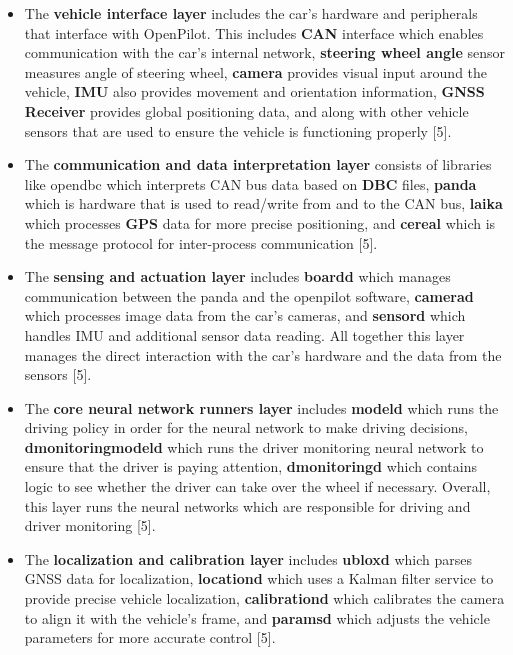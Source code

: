 \documentclass[12pt]{article}
\begin{document}
    \begin{itemize}
        \item The \textbf{vehicle interface layer} includes the car’s hardware and peripherals that interface with OpenPilot. This includes \textbf{CAN} interface which enables communication with the car’s internal network, \textbf{steering wheel angle} sensor measures angle of steering wheel, \textbf{camera} provides visual input around the vehicle, \textbf{IMU} also provides movement and orientation information, \textbf{GNSS Receiver} provides global positioning data, and along with other vehicle sensors that are used to ensure the vehicle is functioning properly [5].
    
        \item The \textbf{communication and data interpretation layer} consists of libraries like opendbc which interprets CAN bus data based on \textbf{DBC} files, \textbf{panda} which is hardware that is used to read/write from and to the CAN bus, \textbf{laika} which processes \textbf{GPS} data for more precise positioning, and \textbf{cereal} which is the message protocol for inter-process communication [5].
        
        \item The \textbf{sensing and actuation layer} includes \textbf{boardd} which manages communication between the panda and the openpilot software, \textbf{camerad} which processes image data from the car’s cameras, and \textbf{sensord} which handles IMU and additional sensor data reading. All together this layer manages the direct interaction with the car’s hardware and the data from the sensors [5].
        
        \item The \textbf{core neural network runners layer} includes \textbf{modeld} which runs the driving policy in order for the neural network to make driving decisions, \textbf{dmonitoringmodeld} which runs the driver monitoring neural network to ensure that the driver is paying attention, \textbf{dmonitoringd} which contains logic to see whether the driver can take over the wheel if necessary. Overall, this layer runs the neural networks which are responsible for driving and driver monitoring [5].
        
        \item The \textbf{localization and calibration layer} includes \textbf{ubloxd} which parses GNSS data for localization, \textbf{locationd} which uses a Kalman filter service to provide precise vehicle localization, \textbf{calibrationd} which calibrates the camera to align it with the vehicle’s frame, and \textbf{paramsd} which adjusts the vehicle parameters for more accurate control [5].
        

\end{itemize}
\end{document}

